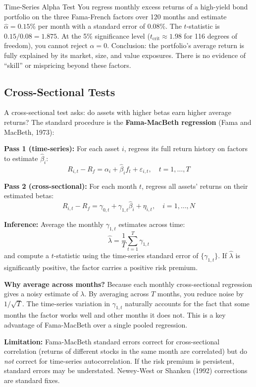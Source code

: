 \begin{workedexample}{Time-Series Alpha Test}
You regress monthly excess returns of a high-yield bond portfolio on the three Fama-French factors over 120 months and estimate $\hat{\alpha} = 0.15\%$ per month with a standard error of $0.08\%$. The $t$-statistic is $0.15/0.08 = 1.875$. At the 5\% significance level ($t_{\text{crit}} \approx 1.98$ for 116 degrees of freedom), you cannot reject $\alpha = 0$. Conclusion: the portfolio's average return is fully explained by its market, size, and value exposures. There is no evidence of ``skill'' or mispricing beyond these factors.
\end{workedexample}

\subsection{Cross-Sectional Tests}

A cross-sectional test asks: do assets with higher betas earn higher average returns? The standard procedure is the \textbf{Fama-MacBeth regression} (Fama and MacBeth, 1973):

\begin{keyidea}
\textbf{Pass 1 (time-series):} For each asset $i$, regress its full return history on factors to estimate $\hat{\beta}_i$:
\[
R_{i,t} - R_f = \alpha_i + \hat{\beta}_i f_t + \varepsilon_{i,t}, \quad t = 1, \ldots, T
\]

\textbf{Pass 2 (cross-sectional):} For each month $t$, regress all assets' returns on their estimated betas:
\[
R_{i,t} - R_f = \gamma_{0,t} + \gamma_{1,t} \hat{\beta}_i + \eta_{i,t}, \quad i = 1, \ldots, N
\]

\textbf{Inference:} Average the monthly $\gamma_{1,t}$ estimates across time:
\[
\hat{\lambda} = \frac{1}{T} \sum_{t=1}^{T} \gamma_{1,t}
\]
and compute a $t$-statistic using the time-series standard error of $\{\gamma_{1,t}\}$. If $\hat{\lambda}$ is significantly positive, the factor carries a positive risk premium.

\textbf{Why average across months?} Because each monthly cross-sectional regression gives a noisy estimate of $\lambda$. By averaging across $T$ months, you reduce noise by $1/\sqrt{T}$. The time-series variation in $\gamma_{1,t}$ naturally accounts for the fact that some months the factor works well and other months it does not. This is a key advantage of Fama-MacBeth over a single pooled regression.

\textbf{Limitation:} Fama-MacBeth standard errors correct for cross-sectional correlation (returns of different stocks in the same month are correlated) but do \emph{not} correct for time-series autocorrelation. If the risk premium is persistent, standard errors may be understated. Newey-West or Shanken (1992) corrections are standard fixes.
\end{keyidea}

